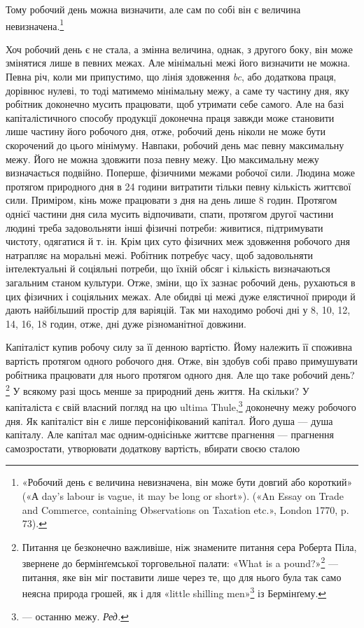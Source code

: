 \parcont{}  %
Тому робочий день можна визначити, але сам по собі він є величина
невизначена.\footnote{
«Робочий день є величина невизначена, він може бути довгий або
короткий» («А day’s labour is vague, it may be long or short»). («An
Essay on Trade and Commerce, containing Observations on Taxation etc.»,
London 1770, p. 73).
}

Хоч робочий день є не стала, а змінна величина, однак, з
другого боку, він може змінятися лише в певних межах. Але мінімальні
межі його визначити не можна. Певна річ, коли ми припустимо,
що лінія здовження \emph{bc}, або додаткова праця, дорівнює
нулеві, то тоді матимемо мінімальну межу, а саме ту частину дня,
яку робітник доконечно мусить працювати, щоб утримати себе
самого. Але на базі капіталістичного способу продукції доконечна
праця завжди може становити лише частину його робочого дня,
отже, робочий день ніколи не може бути скорочений до цього
мінімуму. Навпаки, робочий день має певну максимальну межу.
Його не можна здовжити поза певну межу. Цю максимальну
межу визначається подвійно. Поперше, фізичними межами робочої
сили. Людина може протягом природного дня в 24 години
витратити тільки певну кількість життєвої сили. Приміром, кінь
може працювати з дня на день лише 8 годин. Протягом однієї
частини дня сила мусить відпочивати, спати, протягом другої
частини людині треба задовольняти інші фізичні потреби: живитися,
підтримувати чистоту, одягатися й т. ін. Крім цих суто
фізичних меж здовження робочого дня натрапляє на моральні
межі. Робітник потребує часу, щоб задовольняти інтелектуальні
й соціяльні потреби, що їхній обсяг і кількість визначаються
загальним станом культури. Отже, зміни, що їх зазнає робочий
день, рухаються в цих фізичних і соціяльних межах. Але обидві
ці межі дуже елястичної природи й дають найбільший простір
для варіяцій. Так ми находимо робочі дні у 8, 10, 12, 14, 16, 18
годин, отже, дні дуже різноманітної довжини.

Капіталіст купив робочу силу за її денною вартістю. Йому
належить її споживна вартість протягом одного робочого дня.
Отже, він здобув собі право примушувати робітника працювати
для нього протягом одного дня. Але що таке робочий день?\footnote{
Питання це безконечно важливіше, ніж знамените питання сера
Роберта Піла, звернене до бермінґемської торговельної палати: «What
is a pound?»\footnote*{
Що таке фунт стерлінґів? \emph{Ред.}
} — питання, яке він міг поставити лише через те, що для
нього була так само неясна природа грошей, як і для «little shilling men»\footnote*{
— людців від шилінґів. \emph{Ред.}
}
із Бермінґему.
}
У всякому разі щось менше за природний день життя. На
скільки? У капіталіста є свій власний погляд на цю ultima Thule,\footnote*{
— останню межу. \emph{Ред.}
}
доконечну межу робочого дня. Як капіталіст він є лише персоніфікований
капітал. Його душа — душа капіталу. Але капітал
має одним-однісіньке життєве прагнення — прагнення самозростати,
утворювати додаткову вартість, вбирати своєю сталою
\parbreak{}  %
